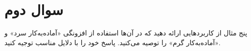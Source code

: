 \section{سوال دوم}

پنج مثال از کاربردهایی ارائه دهید که در آن‌ها استفاده از افزونگی «آماده‌به‌کار سرد» و «آماده‌به‌کار گرم» را توصیه می‌کنید. پاسخ خود را با دلایل مناسب توجیه کنید.

\begin{qsolve}
	
	
\end{qsolve}